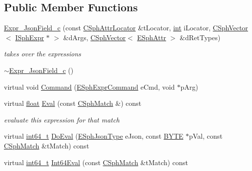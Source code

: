 \subsection*{Public Member Functions}
\begin{DoxyCompactItemize}
\item 
\hyperlink{structExpr__JsonField__c_a90188d2cae6f045e544a20e2191665ea}{Expr\-\_\-\-Json\-Field\-\_\-c} (const \hyperlink{structCSphAttrLocator}{C\-Sph\-Attr\-Locator} \&t\-Locator, \hyperlink{sphinxexpr_8cpp_a4a26e8f9cb8b736e0c4cbf4d16de985e}{int} i\-Locator, \hyperlink{classCSphVector}{C\-Sph\-Vector}$<$ \hyperlink{structISphExpr}{I\-Sph\-Expr} $\ast$ $>$ \&d\-Args, \hyperlink{classCSphVector}{C\-Sph\-Vector}$<$ \hyperlink{sphinxexpr_8h_aa883df0db2e4468a107fdd2d2ae625a3}{E\-Sph\-Attr} $>$ \&d\-Ret\-Types)
\begin{DoxyCompactList}\small\item\em takes over the expressions \end{DoxyCompactList}\item 
\hyperlink{structExpr__JsonField__c_aa2a5e4b77c2f8ffc3a6e93054755cb2a}{$\sim$\-Expr\-\_\-\-Json\-Field\-\_\-c} ()
\item 
virtual void \hyperlink{structExpr__JsonField__c_a9657a35e3daab0e5df1b1674606e8c37}{Command} (\hyperlink{sphinxexpr_8h_a30be184fb07bd80c271360fc6094c818}{E\-Sph\-Expr\-Command} e\-Cmd, void $\ast$p\-Arg)
\item 
virtual \hyperlink{sphinxexpr_8cpp_a0e0d0739f7035f18f949c2db2c6759ec}{float} \hyperlink{structExpr__JsonField__c_ab6b619b3604895e22838a283f48926df}{Eval} (const \hyperlink{classCSphMatch}{C\-Sph\-Match} \&) const 
\begin{DoxyCompactList}\small\item\em evaluate this expression for that match \end{DoxyCompactList}\item 
virtual \hyperlink{sphinxstd_8h_a996e72f71b11a5bb8b3b7b6936b1516d}{int64\-\_\-t} \hyperlink{structExpr__JsonField__c_a25976a82613cb798662eed51768f7d03}{Do\-Eval} (\hyperlink{sphinxjson_8h_ad0338b1aabded682906629a3e477a2a8}{E\-Sph\-Json\-Type} e\-Json, const \hyperlink{sphinxstd_8h_a4ae1dab0fb4b072a66584546209e7d58}{B\-Y\-T\-E} $\ast$p\-Val, const \hyperlink{classCSphMatch}{C\-Sph\-Match} \&t\-Match) const 
\item 
virtual \hyperlink{sphinxstd_8h_a996e72f71b11a5bb8b3b7b6936b1516d}{int64\-\_\-t} \hyperlink{structExpr__JsonField__c_a4ff789b60809641c0bb3e1ca65fdc8f9}{Int64\-Eval} (const \hyperlink{classCSphMatch}{C\-Sph\-Match} \&t\-Match) const 

\end{DoxyCompactItemize}

